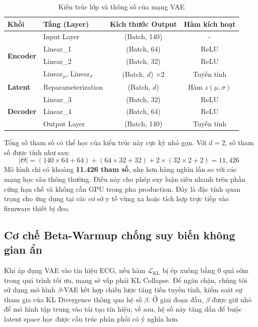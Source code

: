 \documentclass[conference]{IEEEtran}
\begin{document}
\begin{table}[htbp]
\caption{Kiến trúc lớp và thông số của mạng VAE}
\centering
\begin{tabular}{llcc}
\toprule
\textbf{Khối} & \textbf{Tầng (Layer)} & \textbf{Kích thước Output} & \textbf{Hàm kích hoạt} \\
\midrule
\multirow{4}{*}{\textbf{Encoder}} 
& Input Layer & (Batch, 140) & - \\
& Linear\_1 & (Batch, 64) & ReLU \\
& Linear\_2 & (Batch, 32) & ReLU \\
& Linear\(_\mu\), Linear\(_\sigma\) & (Batch, \(d\)) \(\times 2\) & Tuyến tính \\
\midrule
\textbf{Latent} & Reparameterization & (Batch, \(d\)) & Hàm \(z(\mu, \sigma)\) \\
\midrule
\multirow{3}{*}{\textbf{Decoder}} 
& Linear\_3 & (Batch, 32) & ReLU \\
& Linear\_4 & (Batch, 64) & ReLU \\
& Output Layer & (Batch, 140) & Tuyến tính \\
\bottomrule
\end{tabular}
\label{tab:architecture}
\end{table}

Tổng số tham số có thể học của kiến trúc này cực kỳ nhỏ gọn. Với $d=2$, số tham số được tính như sau:
\begin{equation}
|\Theta| = (140 \times 64 + 64) + (64 \times 32 + 32) + 2 \times (32 \times 2 + 2) = 11{,}426
\end{equation}
Mô hình chỉ có khoảng \textbf{11.426 tham số}, nhẹ hơn hàng nghìn lần so với các mạng học sâu thông thường. Điều này cho phép suy luận siêu nhanh trên phần cứng hạn chế và không cần GPU trong pha production. Đây là đặc tính quan trọng cho ứng dụng tại các cơ sở y tế vùng xa hoặc tích hợp trực tiếp vào firmware thiết bị đeo.

\subsection{Cơ chế Beta-Warmup chống suy biến không gian ẩn}
Khi áp dụng VAE vào tín hiệu ECG, nếu hàm \(\mathcal{L}_{\text{KL}}\) bị ép xuống bằng 0 quá sớm trong quá trình tối ưu, mạng sẽ vấp phải KL Collapse. Để ngăn chặn, chúng tôi sử dụng mô hình \(\beta\)-VAE kết hợp chiến lược tăng tiến tuyến tính, kiểm soát sự tham gia của KL Divergence thông qua hệ số \(\beta\). Ở giai đoạn đầu, \(\beta\) được giữ nhỏ để mô hình tập trung vào tái tạo tín hiệu; về sau, hệ số này tăng dần để buộc latent space học được cấu trúc phân phối có ý nghĩa hơn.
\end{document}
